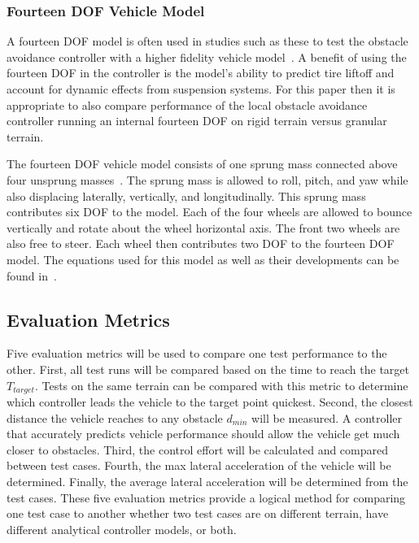 \documentclass[12pt,twocolumn]{article}
\begin{document}

\subsubsection{Fourteen DOF Vehicle Model}\label{sss:14DOFModel}
A fourteen DOF model is often used in studies such as these to test the obstacle avoidance controller with a higher fidelity vehicle model~\cite{ModelFidelity2016, ModelFidelity2013}. A benefit of using the fourteen DOF in the controller is the model’s ability to predict tire liftoff and account for dynamic effects from suspension systems. For this paper then it is appropriate to also compare performance of the local obstacle avoidance controller running an internal fourteen DOF on rigid terrain versus granular terrain.  

The fourteen DOF vehicle model consists of one sprung mass connected above four unsprung masses~\cite{RollStudies2007}. The sprung mass is allowed to roll, pitch, and yaw while also displacing laterally, vertically, and longitudinally. This sprung mass contributes six DOF to the model. Each of the four wheels are allowed to bounce vertically and rotate about the wheel horizontal axis. The front two wheels are also free to steer. Each wheel then contributes two DOF to the fourteen DOF model. The equations used for this model as well as their developments can be found in~\cite{RollStudies2007}.



\subsection{Evaluation Metrics}\label{ss:Metrics}
Five evaluation metrics will be used to compare one test performance to the other. First, all test runs will be compared based on the time to reach the target $T_{target}$. Tests on the same terrain can be compared with this metric to determine which controller leads the vehicle to the target point quickest. Second, the closest distance the vehicle reaches to any obstacle $d_{min}$ will be measured. A controller that accurately predicts vehicle performance should allow the vehicle get much closer to obstacles. Third, the control effort will be calculated and compared between test cases. Fourth, the max lateral acceleration of the vehicle will be determined. Finally, the average lateral acceleration will be determined from the test cases. These five evaluation metrics provide a logical method for comparing one test case to another whether two test cases are on different terrain, have different analytical controller models, or both. 
\end{document}
